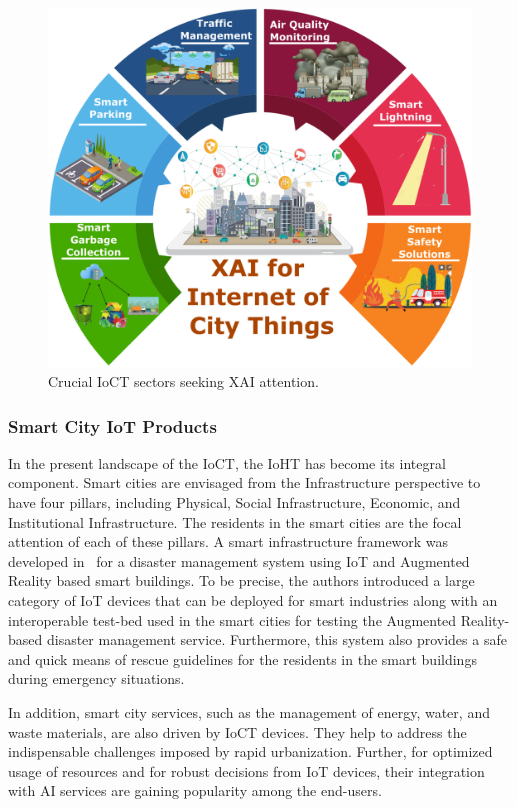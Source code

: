 \documentclass[journal]{IEEEtran}
\begin{document}
\begin{figure}[t]
  \centering    
  \includegraphics[width=\linewidth]{figures/IoCT.png}
  \caption{Crucial IoCT sectors seeking XAI attention.}
     \label{fig:IoCT}
\end{figure}

\subsubsection{Smart City IoT Products}
In the present landscape of the IoCT, the IoHT has become its integral component. Smart cities are envisaged from the Infrastructure perspective to have four pillars, including Physical, Social Infrastructure, Economic, and Institutional Infrastructure. The residents in the smart cities are the focal attention of each of these pillars. A smart infrastructure framework was developed in~\cite{park2018design} for a disaster management system using IoT and Augmented Reality based smart buildings. To be precise, the authors introduced a large category of IoT devices that can be deployed for smart industries along with an interoperable test-bed used in the smart cities for testing the Augmented Reality-based disaster management service. Furthermore, this system also provides a safe and quick means of rescue guidelines for the residents in the smart buildings during emergency situations.  

In addition, smart city services, such as the management of energy, water, and waste materials, are also driven by IoCT devices. They help to address the indispensable challenges imposed by rapid urbanization. Further, for optimized usage of resources and for robust decisions from IoT devices, their integration with AI services are gaining popularity among the end-users.
\end{document}
